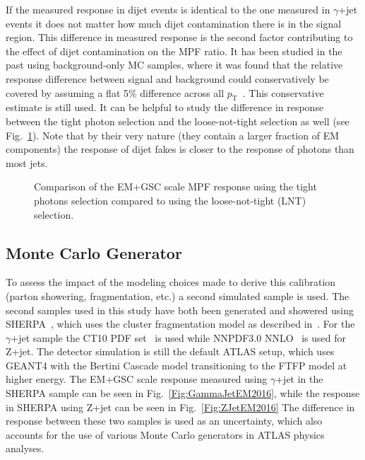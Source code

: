 If the measured response in dijet events is identical to the one measured in $\gamma$+jet events it does not matter how much dijet contamination there is in the signal region.  
This difference in measured response is the second factor contributing to the effect of dijet contamination on the MPF ratio.  
It has been studied in the past using background-only MC samples, where it was found that the relative response difference between signal and background could conservatively be covered by assuming a flat 5\% difference across all $p_{\mathrm T}$~\cite{ATLAS-CONF-2012-063}.  
This conservative estimate is still used.  
It can be helpful to study the difference in response between the tight photon selection and the loose-not-tight selection as well (see Fig.~\ref{fig:RespTightLNTEMGSC}).  
Note that by their very nature (they contain a larger fraction of EM components) the response of dijet fakes is closer to the response of photons than most jets.   


\begin{figure}[!ht]
 \begin{center}
 \end{center}
 \caption[Response using tight photons compared to using loose-not-tight photons, EM+GSC scale]
 {\small Comparison of the EM+GSC scale MPF response using the tight photons selection compared to using the loose-not-tight (LNT) selection.  }
 \label{fig:RespTightLNTEMGSC}
\end{figure}

\subsection{Monte Carlo Generator}

To assess the impact of the modeling choices made to derive this calibration (parton showering, fragmentation, etc.) a second simulated sample is used.  
The second samples used in this study have both been generated and showered using {\sc SHERPA}~\cite{Gleisberg:2008ta}, which uses the cluster fragmentation model as described in~\cite{1983NuPhB.214..201G}.  
For the $\gamma$+jet sample the CT10 PDF set~\cite{Lai:2010vv} is used while NNPDF3.0 NNLO~\cite{Ball:2014uwa} is used for Z+jet.  
The detector simulation is still the default ATLAS setup, which uses GEANT4 with the Bertini Cascade model transitioning to the FTFP model at higher energy.   
The EM+GSC scale response measured using $\gamma$+jet in the {\sc SHERPA} sample can be seen in Fig.~\ref{Fig:GammaJetEM2016}, while the response in {\sc SHERPA} using Z+jet can be seen in Fig.~\ref{Fig:ZJetEM2016}
The difference in response between these two samples is used as an uncertainty, which also accounts for the use of various Monte Carlo generators in ATLAS physics analyses.  

